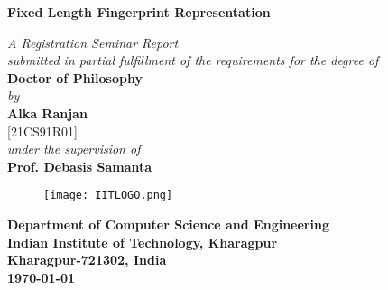 % 

\thispagestyle{empty}
\vspace*{0.4cm}
\begin{center}
	{\huge \bf Fixed Length Fingerprint Representation}
	
	\vspace*{0.8cm} {\em A Registration Seminar Report\\ submitted in partial fulfillment of the requirements for the degree of}\\
	\vspace*{0.5cm}
	{\Large {\bf Doctor of Philosophy}}\\
	\vspace*{0.4cm}
	{\em by}\\
	\vspace*{0.4cm}
	{\Large {\bf Alka Ranjan}}\\
	\vspace*{0.3cm}
	{\large [21CS91R01]}\\
	
	\vspace*{0.4cm}
	{\em under the supervision of }\\
	\vspace*{0.3cm}
	\Large {{\bf Prof. Debasis Samanta}}\\
	\vspace*{0.1cm}
	
	\vspace*{1.5cm}
	
	\begin{figure}[htbp]
		\centerline{\texttt{[image: IITLOGO.png]}}
	\end{figure}
	\vspace*{1cm}
	\Large {{\bf Department of Computer Science and Engineering\\
			\vspace*{0.1cm}
			Indian Institute of Technology, Kharagpur\\
			\vspace*{0.1cm}
			Kharagpur-721302, India\\
			\vspace*{0.1cm}
			\today}} 
\end{center}
\newpage

% 